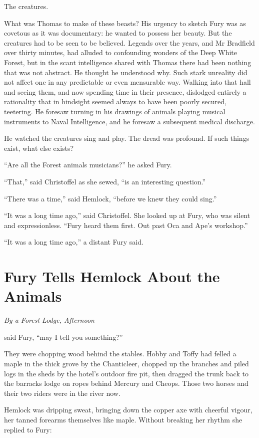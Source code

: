 \documentclass[11pt,a5paper]{article}
\newcommand{\alet}[1]{\textit{#1}\vspace{1em}}
\begin{document}
The creatures.

What was Thomas to make of these beasts? His urgency to sketch Fury was as covetous as it was documentary: he wanted to possess her beauty. But the creatures had to be seen to be believed. Legends over the years, and Mr Bradfield over thirty minutes, had alluded to confounding wonders of the Deep White Forest, but in the scant intelligence shared with Thomas there had been nothing that was not abstract. He thought he understood why. Such stark unreality did not affect one in any predictable or even mensurable way. Walking into that hall and seeing them, and now spending time in their presence, dislodged entirely a rationality that in hindsight seemed always to have been poorly secured, teetering. He foresaw turning in his drawings of animals playing musical instruments to Naval Intelligence, and he foresaw a subsequent medical discharge.

He watched the creatures sing and play. The dread was profound. If such things exist, what else exists?

``Are all the Forest animals musicians?'' he asked Fury.

``That,'' said Christoffel as she sewed, ``is an interesting question.''

``There was a time,'' said Hemlock, ``before we knew they could sing.''

``It was a long time ago,'' said Christoffel. She looked up at Fury, who was silent and expressionless. ``Fury heard them first. Out past Oca and Ape's workshop.''

``It was a long time ago,'' a distant Fury said.

\newpage

\section{Fury Tells Hemlock About the Animals}

\alet{By a Forest Lodge, Afternoon}

 said Fury, ``may I tell you something?''

They were chopping wood behind the stables. Hobby and Toffy had felled a maple in the thick grove by the Chanticleer, chopped up the branches and piled logs in the sheds by the hotel's outdoor fire pit, then dragged the trunk back to the barracks lodge on ropes behind Mercury and Cheops. Those two horses and their two riders were in the river now.

Hemlock was dripping sweat, bringing down the copper axe with cheerful vigour, her tanned forearms themselves like maple. Without breaking her rhythm she replied to Fury:
\end{document}
